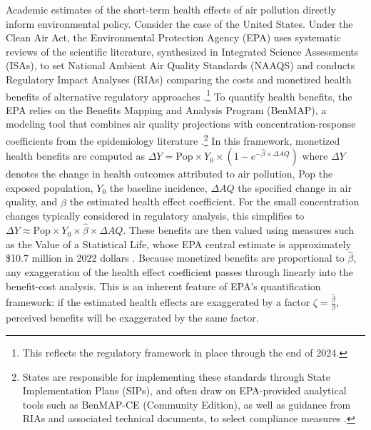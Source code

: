 \documentclass[12pt]{article}
\begin{document}
		Academic estimates of the short-term health effects of air pollution directly inform environmental policy. Consider the case of the United States. Under the Clean Air Act, the Environmental Protection Agency (EPA) uses systematic reviews of the scientific literature, synthesized in Integrated Science Assessments (ISAs), to set National Ambient Air Quality Standards (NAAQS) and conducts Regulatory Impact Analyses (RIAs) comparing the costs and monetized health benefits of alternative regulatory approaches \citep{u.s.epa_preamble_2015, u.s.epa_final_2024}.\footnote{This reflects the regulatory framework in place through the end of 2024.} To quantify health benefits, the EPA relies on the Benefits Mapping and Analysis Program (BenMAP), a modeling tool that combines air quality projections with concentration-response coefficients from the epidemiology literature \citep{sacks_environmental_2018}.\footnote{States are responsible for implementing these standards through State Implementation Plans (SIPs), and often draw on EPA-provided analytical tools such as BenMAP-CE (Community Edition), as well as guidance from RIAs and associated technical documents, to select compliance measures \citep{u.s.epa_environmental_2023}.} In this framework, monetized health benefits are computed as $\Delta Y = \text{Pop} \times Y_0 \times (1 - e^{-\hat{\beta} \times \Delta AQ})$ where $\Delta Y$ denotes the change in health outcomes attributed to air pollution, Pop the exposed population, $Y_0$ the baseline incidence, $\Delta AQ$ the specified change in air quality, and $\hat{\beta}$ the estimated health effect coefficient. For the small concentration changes typically considered in regulatory analysis, this simplifies to $\Delta Y \approx \text{Pop} \times Y_0 \times \hat{\beta} \times \Delta AQ$. These benefits are then valued using measures such as the Value of a Statistical Life, whose EPA central estimate is approximately \$10.7 million in 2022 dollars \citep{u.s.epa_guidelines_2024}. Because monetized benefits are proportional to $\hat{\beta}$, any exaggeration of the health effect coefficient passes through linearly into the benefit-cost analysis. This is an inherent feature of EPA's quantification framework: if the estimated health effects are exaggerated by a factor $\zeta = \frac{\hat{\beta}}{\beta}$, perceived benefits will be exaggerated by the same factor. 
		
\end{document}
